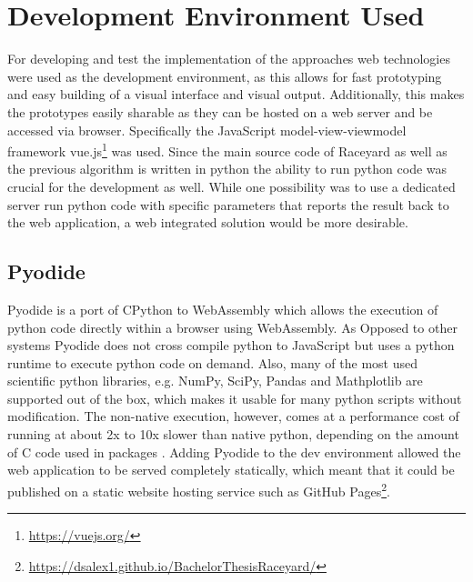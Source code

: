 \section{Development Environment Used}
For developing and test the implementation of the approaches web technologies were used as the development environment, as this allows for fast prototyping and easy building of a visual interface and visual output. Additionally, this makes the prototypes easily sharable as they can be hosted on a web server and be accessed via browser. Specifically the JavaScript model-view-viewmodel framework vue.js\footnote{\url{https://vuejs.org/}} was used. Since the main source code of Raceyard as well as the previous algorithm is written in python the ability to run python code was crucial for the development as well. While one possibility was to use a dedicated server run python code with specific parameters that reports the result back to the web application, a web integrated solution would be more desirable.

\subsection{Pyodide}
Pyodide is a port of CPython to WebAssembly \cite{pyodide} which allows the execution of python code directly within a browser using WebAssembly. As Opposed to other systems Pyodide does not cross compile python to JavaScript but uses a python runtime to execute python code on demand. Also, many of the most used scientific python libraries, e.g. NumPy, SciPy, Pandas and Mathplotlib are supported out of the box, which makes it usable for many python scripts without modification. The non-native execution, however, comes at a performance cost of running at about 2x to 10x slower than native python, depending on the amount of C code used in packages \cite{pyodide2021}\cite{Jangda2019}. Adding Pyodide to the dev environment allowed the web application to be served completely statically, which meant that it could be published on a static website hosting service such as GitHub Pages\footnote{\url{https://dsalex1.github.io/BachelorThesisRaceyard/}}.
